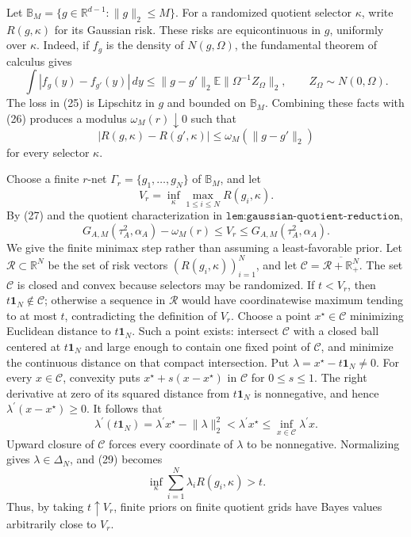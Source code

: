 Let \(\mathbb B_M=\{g\in\mathbb R^{d-1}:\lVert g\rVert_2\leq M\}\).  For a randomized quotient selector \(\kappa\), write \(R(g,\kappa)\) for its Gaussian risk.  These risks are equicontinuous in \(g\), uniformly over \(\kappa\).  Indeed, if \(f_g\) is the density of \(N(g,\Omega)\), the fundamental theorem of calculus gives
\[
 \int|f_g(y)-f_{g'}(y)|\,dy
 \leq \lVert g-g'\rVert_2
       \mathbb E\lVert\Omega^{-1}Z_\Omega\rVert_2,
 \qquad Z_\Omega\sim N(0,\Omega).                              \tag{26}
\]
The loss in (25) is Lipschitz in \(g\) and bounded on \(\mathbb B_M\).  Combining these facts with (26) produces a modulus \(\omega_M(r)\downarrow0\) such that
\[
 |R(g,\kappa)-R(g',\kappa)|
 \leq\omega_M(\lVert g-g'\rVert_2)                              \tag{27}
\]
for every selector \(\kappa\).

Choose a finite \(r\)-net \(\Gamma_r=\{g_1,\ldots,g_N\}\) of \(\mathbb B_M\), and let
\[
 V_r=\inf_\kappa\max_{1\leq i\leq N}R(g_i,\kappa).
\]
By (27) and the quotient characterization in \(\texttt{lem:gaussian-quotient-reduction}\),
\[
 G_{A,M}(\tau_A^2,\alpha_A)-\omega_M(r)
 \leq V_r\leq G_{A,M}(\tau_A^2,\alpha_A).                       \tag{28}
\]
We give the finite minimax step rather than assuming a least-favorable prior.  Let \(\mathscr R\subset\mathbb R^N\) be the set of risk vectors
\((R(g_i,\kappa))_{i=1}^N\), and let
\(\mathscr C=\overline{\mathscr R+\mathbb R_+^N}\).  The set \(\mathscr C\) is closed and convex because selectors may be randomized.  If \(t<V_r\), then \(t\mathbf1_N\notin\mathscr C\); otherwise a sequence in \(\mathscr R\) would have coordinatewise maximum tending to at most \(t\), contradicting the definition of \(V_r\).  Choose a point \(x^\star\in\mathscr C\) minimizing Euclidean distance to \(t\mathbf1_N\).  Such a point exists: intersect \(\mathscr C\) with a closed ball centered at \(t\mathbf1_N\) and large enough to contain one fixed point of \(\mathscr C\), and minimize the continuous distance on that compact intersection.  Put \(\lambda=x^\star-t\mathbf1_N\ne0\).  For every \(x\in\mathscr C\), convexity puts \(x^\star+s(x-x^\star)\) in \(\mathscr C\) for \(0\leq s\leq1\).  The right derivative at zero of its squared distance from \(t\mathbf1_N\) is nonnegative, and hence \(\lambda^{\prime}(x-x^\star)\geq0\).  It follows that
\[
 \lambda^{\prime}(t\mathbf1_N)
 =\lambda^{\prime}x^\star-\lVert\lambda\rVert_2^2
 <\lambda^{\prime}x^\star
 \leq\inf_{x\in\mathscr C}\lambda^{\prime}x.                  \tag{29}
\]
Upward closure of \(\mathscr C\) forces every coordinate of \(\lambda\) to be nonnegative.  Normalizing gives \(\lambda\in\Delta_N\), and (29) becomes
\[
 \inf_\kappa\sum_{i=1}^N\lambda_iR(g_i,\kappa)>t.              \tag{30}
\]
Thus, by taking \(t\uparrow V_r\), finite priors on finite quotient grids have Bayes values arbitrarily close to \(V_r\).

